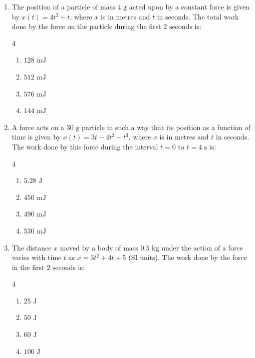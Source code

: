 \documentclass[11pt,a4paper]{article}
\begin{document}
\begin{enumerate}[label=\textbf{\arabic*.},leftmargin=18pt,itemsep=8pt,resume]

  \item The position of a particle of mass $4\text{ g}$ acted upon by a constant force is given by $x(t) = 4t^2 + t$, where $x$ is in metres and $t$ in seconds. The total work done by the force on the particle during the first $2\text{ seconds}$ is:
  \begin{multicols}{4}
    \begin{enumerate}[label=(\Alph*)]
      \item $128\text{ mJ}$
      \item $512\text{ mJ}$
      \item $576\text{ mJ}$
      \item $144\text{ mJ}$
    \end{enumerate}
  \end{multicols}

  \item A force acts on a $30\text{ g}$ particle in such a way that its position as a function of time is given by $x(t) = 3t - 4t^2 + t^3$, where $x$ is in metres and $t$ in seconds. The work done by this force during the interval $t = 0$ to $t = 4\text{ s}$ is:
  \begin{multicols}{4}
    \begin{enumerate}[label=(\Alph*)]
      \item $5.28\text{ J}$
      \item $450\text{ mJ}$
      \item $490\text{ mJ}$
      \item $530\text{ mJ}$
    \end{enumerate}
  \end{multicols}

  \item The distance $x$ moved by a body of mass $0.5\text{ kg}$ under the action of a force varies with time $t$ as $x = 3t^2 + 4t + 5$ (SI units). The work done by the force in the first $2\text{ seconds}$ is:
  \begin{multicols}{4}
    \begin{enumerate}[label=(\Alph*)]
      \item $25\text{ J}$
      \item $50\text{ J}$
      \item $60\text{ J}$
      \item $100\text{ J}$
    \end{enumerate}
  \end{multicols}


\end{enumerate}
\end{document}
